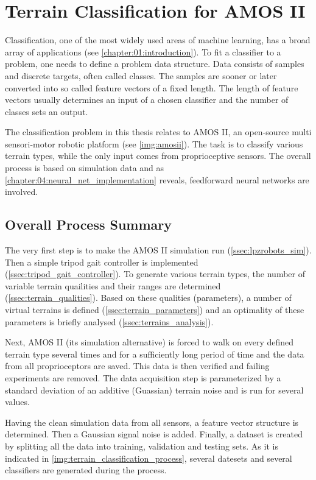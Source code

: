 \chapter{Terrain Classification for AMOS II} \label{chapter:05:terrain_classification}
Classification, one of the most widely used areas of machine learning, has a broad array of applications (see \cref{chapter:01:introduction}). To fit a classifier to a problem, one needs to define a problem data structure. Data consists of samples and discrete targets, often called classes. The samples are sooner or later converted into so called feature vectors of a fixed length. The length of feature vectors usually determines an input of a chosen classifier and the number of classes sets an output.

The classification problem in this thesis relates to AMOS II, an open-source multi sensori-motor robotic platform (see \cref{img:amosii}). The task is to classify various terrain types, while the only input comes from proprioceptive sensors. The overall process is based on simulation data and as \cref{chapter:04:neural_net_implementation} reveals, feedforward neural networks are involved.

\section{Overall Process Summary} \label{sec:overall_process_summary}
The very first step is to make the AMOS II simulation run (\cref{ssec:lpzrobots_sim}). Then a simple tripod gait controller is implemented (\cref{ssec:tripod_gait_controller}). To generate various terrain types, the number of variable terrain quailities and their ranges are determined (\cref{ssec:terrain_qualities}). Based on these qualities (parameters), a number of virtual terrains is defined (\cref{ssec:terrain_parameters}) and an optimality of these parameters is briefly analysed (\cref{ssec:terrains_analysis}).

Next, AMOS II (its simulation alternative) is forced to walk on every defined terrain type several times and for a sufficiently long period of time and the data from all proprioceptors are saved. This data is then verified and failing experiments are removed. The data acquisition step is parameterized by a standard deviation of an additive (Guassian) terrain noise and is run for several values.

Having the clean simulation data from all sensors, a feature vector structure is determined. Then a Gaussian signal noise is added. Finally, a dataset is created by splitting all the data into training, validation and testing sets. As it is indicated in \cref{img:terrain_classification_process}, several datesets and several classifiers are generated during the process. 

